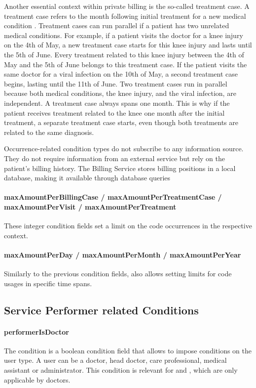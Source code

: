 Another essential context within private billing is the so-called treatment case.
A treatment case refers to the month following initial treatment for a new medical condition \cite{bruck1998kommentar}.
Treatment cases can run parallel if a patient has two unrelated medical conditions.
For example, if a patient visits the doctor for a knee injury on the 4th of May, a new treatment case starts for this knee injury and lasts until the 5th of June.
Every treatment related to this knee injury between the 4th of May and the 5th of June belongs to this treatment case.
If the patient visits the same doctor for a viral infection on the 10th of May, a second treatment case begins, lasting until the 11th of June.
Two treatment cases run in parallel because both medical conditions, the knee injury, and the viral infection, are independent.
A treatment case always spans one month.
This is why if the patient receives treatment related to the knee one month after the initial treatment, a separate treatment case starts, even though both treatments are related to the same diagnosis.

Occurrence-related condition types do not subscribe to any information source.
They do not require information from an external service but rely on the patient's billing history.
The Billing Service stores billing positions in a local database, making it available through database queries


\paragraph{maxAmountPerBillingCase / maxAmountPerTreatmentCase / maxAmountPerVisit / maxAmountPerTreatment}
These integer condition fields set a limit on the code occurrences in the respective context.

\paragraph{maxAmountPerDay / maxAmountPerMonth / maxAmountPerYear}
Similarly to the previous condition fields, \RL also allows setting limits for code usages in specific time spans.

\subsection{Service Performer related Conditions}\label{subsec:service-performer-related-conditions}

\paragraph{performerIsDoctor}
The  condition is a boolean condition field that allows to impose conditions on the user type.
A user can be a doctor, head doctor, care professional, medical assistant or administrator.
This condition is relevant for  and , which are only applicable by doctors.


